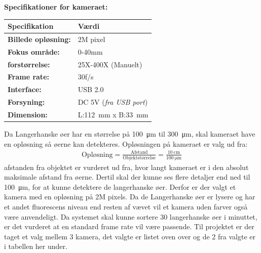 \textbf{Specifikationer for kameraet:} 
\begin{center}
		\begin{longtable}{ | m{6.5cm} | m{6.5cm}| } 
			\hline
			\textbf{Specifikation} &\textbf{Værdi} \\ 
			\hline
			\textbf{Billede opløsning:} & 2M pixel \\ 
			\hline
			\textbf{Fokus område:} & 0-40mm  \\ 
			\hline
			\textbf{forstørrelse:} & 25X-400X (Manuelt)  \\ 
			\hline
			\textbf{Frame rate:} & 30f/s  \\ 
			\hline
			\textbf{Interface:} & USB 2.0  \\ 
			\hline
			\textbf{Forsyning:} & DC 5V (\textit{fra USB port})  \\ 
			\hline
			\textbf{Dimension:} & L:\SI{112}{\milli\metre} x B:\SI{33}{\milli\metre}  \\ 
			\hline			
		\end{longtable}
		
	\end{center}
Da Langerhanske øer har en størrelse på \SI{100}{\micro\metre} til \SI{300}{\micro\metre}, skal kameraet have en opløsning så øerne kan detekteres. Opløsningen på kameraet er valg ud fra:
\begin{align}
\text{Opløsning} = \frac{\text{Afstand}}{\text{Objektstørrelse}} = \frac{\SI{10}{\centi\metre}}{\SI{100}{\micro\metre}} 
\end{align} \citep[s.5]{DH1}
afstanden fra objektet er vurderet ud fra, hvor langt kameraet er i den absolut maksimale afstand fra øerne. Dertil skal der kunne ses flere detaljer end ned til \SI{100}{\micro\metre}, for at kunne detektere de langerhanske øer. Derfor er der valgt et kamera med en opløsning på 2M pixels. Da de Langerhanske øer er lysere og har et andet fluorescens niveau end resten af vævet vil et kamera uden farver også være anvendeligt. Da systemet skal kunne sortere 30 langerhanske øer i minuttet, er det vurderet at en standard frame rate vil være passende. Til projektet er der taget et valg mellem 3 kamera, det valgte er listet oven over og de 2 fra valgte er i tabellen her under.

